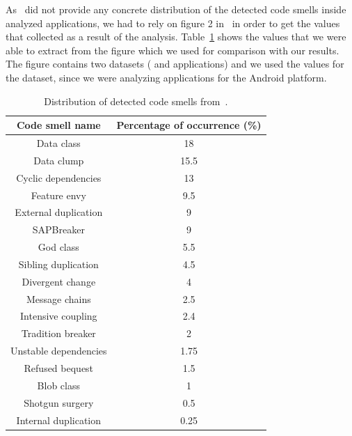 As~\citeauthor{mannan2016understanding} did not provide any concrete distribution of the detected
code smells inside analyzed applications, we had to rely on figure 2 in~\cite{mannan2016understanding} in order
to get the values that collected as a result of the analysis.
Table~\ref{tab:understading_andoid_smells_values} shows the values that we were able to extract from the figure which we used for comparison
with our results.
The figure contains two datasets ( and  applications) and we used the values for the 
dataset, since we were analyzing applications for the Android platform.

\begin{table}
    \begin{center}
        \begin{tabular} {| c | c |}
            \hline
            \textbf{Code smell name} & \textbf{Percentage of occurrence (\%)} \\ \hline
            Data class & 18 \\ \hline
            Data clump & 15.5 \\ \hline
            Cyclic dependencies & 13 \\ \hline
            Feature envy & 9.5 \\ \hline
            External duplication & 9 \\ \hline
            SAPBreaker & 9 \\ \hline
            God class & 5.5 \\ \hline
            Sibling duplication & 4.5 \\ \hline
            Divergent change & 4 \\ \hline
            Message chains & 2.5 \\ \hline
            Intensive coupling & 2.4 \\ \hline
            Tradition breaker & 2 \\ \hline
            Unstable dependencies & 1.75 \\ \hline
            Refused bequest & 1.5 \\ \hline
            Blob class & 1 \\ \hline
            Shotgun surgery & 0.5 \\ \hline
            Internal duplication & 0.25 \\ \hline
        \end{tabular}
        \caption{Distribution of detected code smells from~\cite{mannan2016understanding}.}
        \label{tab:understading_andoid_smells_values}
    \end{center}
\end{table}

